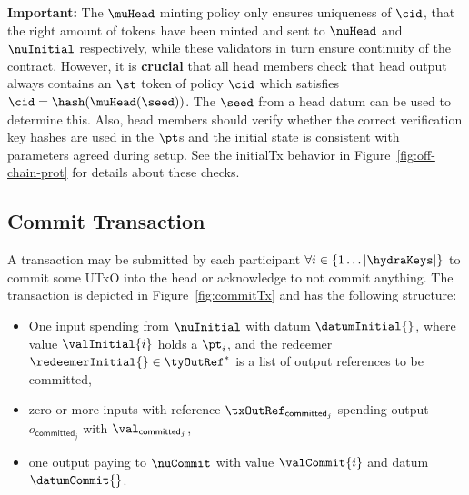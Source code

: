 \noindent \textbf{Important:} The $\muHead$ minting policy only ensures
uniqueness of $\cid$, that the right amount of tokens have been minted and sent
to $\nuHead$ and $\nuInitial$ respectively, while these validators in turn
ensure continuity of the contract. However, it is \textbf{crucial} that all head
members check that head output always contains an $\st$ token of policy $\cid$
which satisfies $\cid = \hash(\muHead(\seed))$. The $\seed$ from a head datum
can be used to determine this. Also, head members should verify whether the
correct verification key hashes are used in the $\pt$s and the initial state is
consistent with parameters agreed during setup. See the initialTx behavior in
Figure~\ref{fig:off-chain-prot} for details about these checks.\\

\subsection{Commit Transaction}\label{sec:commit-tx}

A \mtxCom{} transaction may be submitted by each participant
$\forall i \in \{1 \dots |\hydraKeys|\}$ to commit some UTxO into the head or
acknowledge to not commit anything. The transaction is depicted in
Figure~\ref{fig:commitTx} and has the following structure:
\begin{itemize}
	\item One input spending from $\nuInitial$ with datum $\datumInitial{}$,
	      where value $\valInitial{i}$ holds a $\pt_i$, and the redeemer
	      $\redeemerInitial{} \in \tyOutRef^{*}$ is a list of output
	      references to be committed,
	\item zero or more inputs with reference $\txOutRef_{\mathsf{committed}_{j}}$
	      spending output $o_{\mathsf{committed}_{j}}$ with
	      $\val_{\mathsf{committed}_{j}}$,
	\item one output paying to $\nuCommit$ with value $\valCommit{i}$ and datum $\datumCommit{}$.
\end{itemize}

